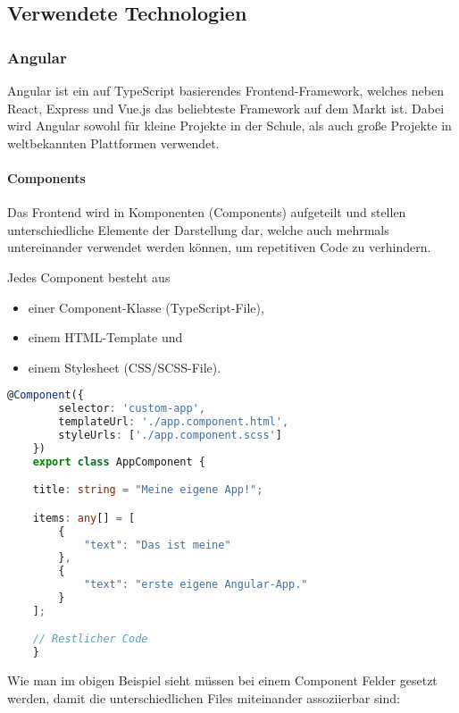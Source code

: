 \subsection{Verwendete Technologien}

\subsubsection{Angular}

Angular ist ein auf TypeScript basierendes Frontend-Framework, welches neben React, Express und Vue.js das beliebteste Framework auf dem Markt ist. \cite{SFT} Dabei wird Angular sowohl für kleine Projekte in der Schule, als auch große Projekte in weltbekannten Plattformen verwendet.

\paragraph*{Components}

Das Frontend wird in Komponenten (Components) aufgeteilt und stellen unterschiedliche Elemente der Darstellung dar, welche auch mehrmals untereinander verwendet werden können, um repetitiven Code zu verhindern.

Jedes Component besteht aus

\begin{itemize}
    \item einer Component-Klasse (TypeScript-File),
    \item einem HTML-Template und
    \item einem Stylesheet (CSS/SCSS-File).
\end{itemize}

\begin{lstlisting}[language=TypeScript,caption={Beispiel eines Angular-Components}]
    @Component({
        selector: 'custom-app',
        templateUrl: './app.component.html',
        styleUrls: ['./app.component.scss']
    })
    export class AppComponent {

    title: string = "Meine eigene App!";

    items: any[] = [
        {
            "text": "Das ist meine"
        },
        {
            "text": "erste eigene Angular-App."
        }
    ];

    // Restlicher Code
    }
\end{lstlisting}

Wie man im obigen Beispiel sieht müssen bei einem Component Felder gesetzt werden, damit die unterschiedlichen Files miteinander assoziierbar sind:

